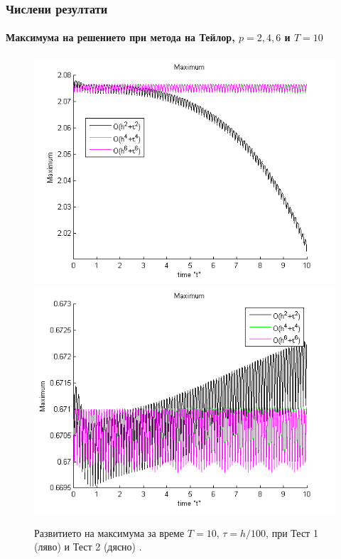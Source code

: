 \documentclass{beamer}
\begin{document}
\begin{frame}
\frametitle{Числени резултати}
\framesubtitle{Максимума на решението при метода на Тейлор, $p=2,4,6$ и $T=10$}

\begin{figure}[ht]
	\centering
	\begin{minipage}[b]{0.4\linewidth}
		\includegraphics[width=\linewidth]{../amitans/figures/maximum_30_bt3_c045_h005.png}
	\end{minipage}	
	\begin{minipage}[b]{0.4\linewidth}
		 \includegraphics[width=\linewidth]{../amitans/figures/maximum_128_bt1_c090_h010.png}
	\end{minipage}

Развитието на максимума за време $T=10$, $\tau = h/100$, при Тест 1 (ляво) и Тест 2 (дясно) .
\end{figure}

\end{frame}
\end{document}
